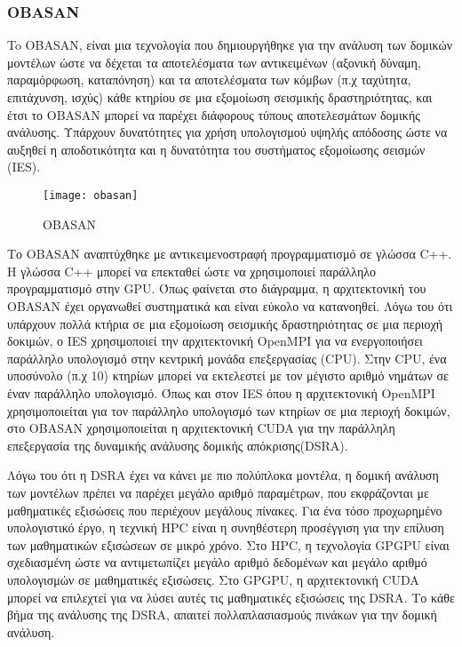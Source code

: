 \subsubsection{OBASAN}
To OBASAN, είναι μια τεχνολογία που δημιουργήθηκε για την ανάλυση των δομικών μοντέλων ώστε να δέχεται τα αποτελέσματα των αντικειμένων (αξονική δύναμη, παραμόρφωση, καταπόνηση) και τα αποτελέσματα των κόμβων (π.χ ταχύτητα, επιτάχυνση, ισχύς) κάθε κτηρίου σε μια εξομοίωση σεισμικής δραστηριότητας, και έτσι το OBASAN μπορεί να παρέχει διάφορους τύπους αποτελεσμάτων δομικής ανάλυσης. Υπάρχουν δυνατότητες για χρήση υπολογισμού υψηλής απόδοσης ώστε να αυξηθεί η αποδοτικότητα και η δυνατότητα του συστήματος εξομοίωσης σεισμών (IES). 

\begin{figure}[h]
\centering
\hspace*{-1.0in}
\texttt{[image: obasan]}
\caption{OBASAN}
\end{figure}

Το OBASAN αναπτύχθηκε με αντικειμενοστραφή προγραμματισμό σε γλώσσα C++. Η γλώσσα C++ μπορεί να επεκταθεί ώστε να χρησιμοποιεί παράλληλο προγραμματισμό στην GPU. Όπως φαίνεται στο διάγραμμα, η αρχιτεκτονική του OBASAN έχει οργανωθεί συστηματικά και είναι εύκολο να κατανοηθεί. Λόγω του ότι υπάρχουν πολλά κτήρια σε μια εξομοίωση σεισμικής δραστηριότητας σε μια περιοχή δοκιμών, ο IES χρησιμοποιεί την αρχιτεκτονική OpenMPI για να ενεργοποιήσει παράλληλο υπολογισμό στην κεντρική μονάδα επεξεργασίας (CPU). Στην CPU, ένα υποσύνολο (π.χ 10) κτηρίων μπορεί να εκτελεστεί με τον μέγιστο αριθμό νημάτων σε έναν παράλληλο υπολογισμό. Όπως και στον IES όπου η αρχιτεκτονική OpenMPI χρησιμοποιείται για τον παράλληλο υπολογισμό των κτηρίων σε μια περιοχή δοκιμών, στο OBASAN χρησιμοποιείται η αρχιτεκτονική CUDA για την παράλληλη επεξεργασία της δυναμικής ανάλυσης δομικής απόκρισης(DSRA).

Λόγω του ότι η DSRA έχει να κάνει με πιο πολύπλοκα μοντέλα, η δομική ανάλυση των μοντέλων πρέπει να παρέχει μεγάλο αριθμό παραμέτρων, που εκφράζονται με μαθηματικές εξισώσεις που περιέχουν μεγάλους πίνακες. Για ένα τόσο προχωρημένο υπολογιστικό έργο, η τεχνική HPC είναι η συνηθέστερη προσέγγιση για την επίλυση των μαθηματικών εξισώσεων σε μικρό χρόνο. Στο HPC, η τεχνολογία GPGPU είναι σχεδιασμένη ώστε να αντιμετωπίζει μεγάλο αριθμό δεδομένων και μεγάλο αριθμό υπολογισμών σε μαθηματικές εξισώσεις. Στο GPGPU, η αρχιτεκτονική CUDA μπορεί να επιλεχτεί για να λύσει αυτές τις μαθηματικές εξισώσεις της DSRA. Το κάθε βήμα της ανάλυσης της DSRA, απαιτεί πολλαπλασιασμούς πινάκων για την δομική ανάλυση.

